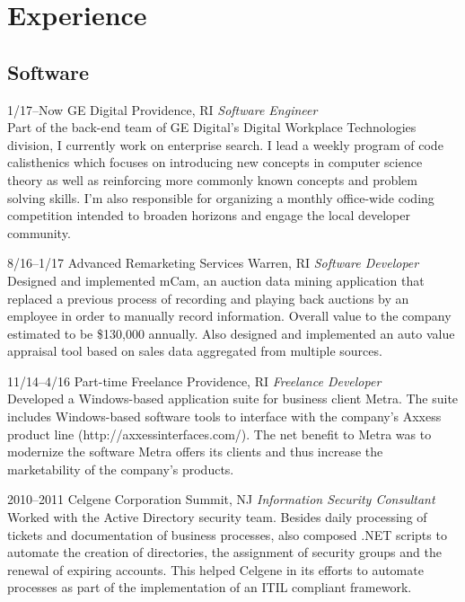 \documentclass[]{friggeri-cv}
\begin{document}
\section{Experience}

\subsection{Software}

\begin{entrylist}


\entry
{1/17--Now}
{GE Digital}
{Providence, RI}
{\emph{Software Engineer} \\
Part of the back-end team of GE Digital's Digital Workplace Technologies division, I currently work on enterprise search.  I lead a weekly program of code calisthenics which focuses on introducing new concepts in computer science theory as well as reinforcing more commonly known concepts and problem solving skills.  I'm also responsible for organizing a monthly office-wide coding competition intended to broaden horizons and engage the local developer community.}

\entry
{8/16--1/17}
{Advanced Remarketing Services}
{Warren, RI}
{\emph{Software Developer} \\
Designed and implemented mCam, an auction data mining application that replaced a previous process of recording and playing back auctions by an employee in order to manually record information. Overall value to the company estimated to be \$130,000 annually.  Also designed and implemented an auto value appraisal tool based on sales data aggregated from multiple sources.}

\entry
{11/14--4/16}
{Part-time Freelance}
{Providence, RI}
{\emph{Freelance Developer} \\
Developed a Windows-based application suite for business client Metra.  The suite includes Windows-based software tools to interface with the company's Axxess product line (http://axxessinterfaces.com/).  The net benefit to Metra was to modernize the software Metra offers its clients and thus increase the marketability of the company's products. }

\end{entrylist}
\begin{entrylist}
\entry
{2010--2011}
{Celgene Corporation}
{Summit, NJ}
{\emph{Information Security Consultant} \\
Worked with the Active Directory security team.  Besides daily processing of tickets and documentation of business processes, also composed .NET scripts to automate the creation of directories, the assignment of security groups and the renewal of expiring accounts.   This helped Celgene in its efforts to automate processes as part of the implementation of an ITIL compliant framework.}

\\ \\ \\
\end{entrylist}
\end{document}
